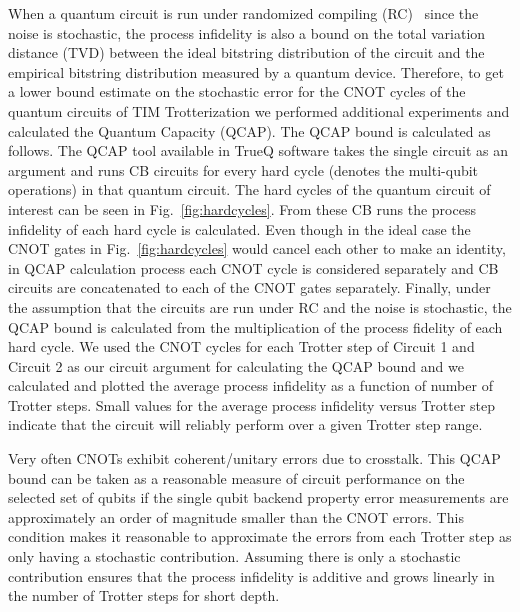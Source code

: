 When a quantum circuit is run under randomized compiling (RC)~\cite{Wallman2016} since the noise is stochastic, the process infidelity is also a bound on the total variation distance (TVD) between the ideal bitstring distribution of the circuit and the empirical bitstring distribution measured by a quantum device. Therefore, to get a lower bound estimate on the stochastic error for the CNOT cycles of the quantum circuits of TIM Trotterization we performed additional experiments and calculated the Quantum Capacity (QCAP). The QCAP bound is calculated as follows. The QCAP tool available in TrueQ software takes the single circuit as an argument and runs CB circuits for every hard cycle (denotes the multi-qubit operations) in that quantum circuit. The hard cycles of the quantum circuit of interest can be seen in Fig.~\ref{fig:hardcycles}. From these CB runs the process infidelity of each hard cycle is calculated. Even though in the ideal case the CNOT gates in Fig.~\ref{fig:hardcycles} would cancel each other to make an identity, in QCAP calculation process each CNOT cycle is considered separately and CB circuits are concatenated to each of the CNOT gates separately. Finally, under the assumption that the circuits are run under RC and the noise is stochastic, the QCAP bound is calculated from the multiplication of the process fidelity of each hard cycle.  
We used the CNOT cycles for each Trotter step of Circuit 1 and Circuit 2 as our circuit argument for calculating the QCAP bound and we calculated and plotted the average process infidelity as a function of number of Trotter steps.
Small values for the average process infidelity versus Trotter step indicate that the circuit will reliably perform over a given Trotter step range.  


Very often CNOTs exhibit coherent/unitary errors due to crosstalk. This QCAP bound can be taken as a reasonable measure of circuit performance on the selected set of qubits if the single qubit backend property error measurements are approximately an order of magnitude smaller than the CNOT errors.  This condition makes it reasonable to approximate the errors from each Trotter step as only having a stochastic contribution.  Assuming there is only a stochastic contribution ensures that the process infidelity is additive and grows linearly in the number of Trotter steps for short depth.




